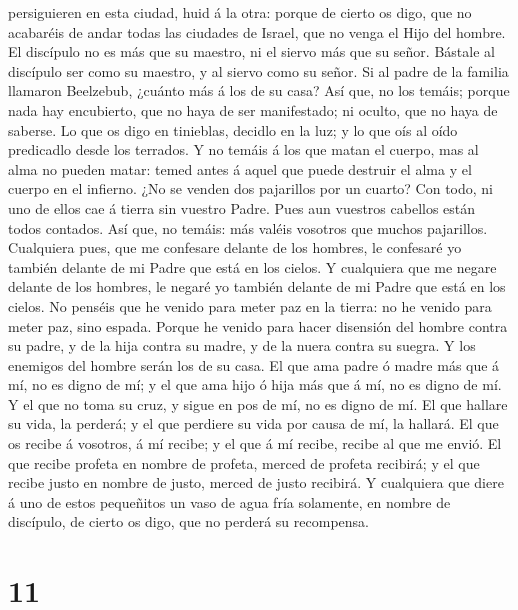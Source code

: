 persiguieren en esta ciudad, huid á la otra: porque de cierto os digo,
que no acabaréis de andar todas las ciudades de Israel, que no venga el
Hijo del hombre.  El discípulo no es más que su maestro, ni
el siervo más que su señor.  Bástale al discípulo ser como
su maestro, y al siervo como su señor. Si al padre de la familia
llamaron Beelzebub, ¿cuánto más á los de su casa?  Así que,
no los temáis; porque nada hay encubierto, que no haya de ser
manifestado; ni oculto, que no haya de saberse.  Lo que os
digo en tinieblas, decidlo en la luz; y lo que oís al oído predicadlo
desde los terrados.  Y no temáis á los que matan el cuerpo,
mas al alma no pueden matar: temed antes á aquel que puede destruir el
alma y el cuerpo en el infierno.  ¿No se venden dos
pajarillos por un cuarto? Con todo, ni uno de ellos cae á tierra sin
vuestro Padre.  Pues aun vuestros cabellos están todos
contados.  Así que, no temáis: más valéis vosotros que
muchos pajarillos.  Cualquiera pues, que me confesare
delante de los hombres, le confesaré yo también delante de mi Padre que
está en los cielos.  Y cualquiera que me negare delante de
los hombres, le negaré yo también delante de mi Padre que está en los
cielos.  No penséis que he venido para meter paz en la
tierra: no he venido para meter paz, sino espada.  Porque
he venido para hacer disensión del hombre contra su padre, y de la hija
contra su madre, y de la nuera contra su suegra.  Y los
enemigos del hombre serán los de su casa.  El que ama padre
ó madre más que á mí, no es digno de mí; y el que ama hijo ó hija más
que á mí, no es digno de mí.  Y el que no toma su cruz, y
sigue en pos de mí, no es digno de mí.  El que hallare su
vida, la perderá; y el que perdiere su vida por causa de mí, la hallará.
 El que os recibe á vosotros, á mí recibe; y el que á mí
recibe, recibe al que me envió.  El que recibe profeta en
nombre de profeta, merced de profeta recibirá; y el que recibe justo en
nombre de justo, merced de justo recibirá.  Y cualquiera
que diere á uno de estos pequeñitos un vaso de agua fría solamente, en
nombre de discípulo, de cierto os digo, que no perderá su recompensa.

\hypertarget{section-10}{%
\section{11}\label{section-10}}

